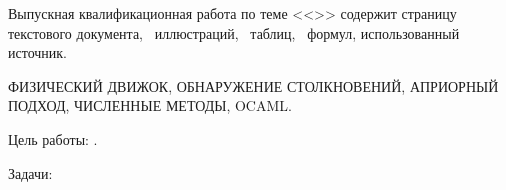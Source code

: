 
Выпускная квалификационная работа по теме <<\Topic>> содержит
\pageref{LastPage} страницу текстового документа, %
\totalfigures~иллюстраций,
\totaltables~таблиц,
\totalequations~формул,
 использованный источник.

\MakeUppercase{
    физический движок,
    обнаружение столкновений,
    априорный подход,
    численные методы,
    OCaml.
}

Цель работы: \Target.

Задачи:

\Tasks
